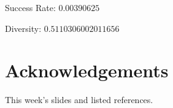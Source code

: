 \documentclass{article}
\begin{document}
\begin{arrowlist}
    \item Success Rate: $0.00390625$
    \item Diversity: $0.5110306002011656$
\end{arrowlist}

\clearpage

\section*{Acknowledgements}
This week's slides and listed references.




\clearpage

\end{document}

